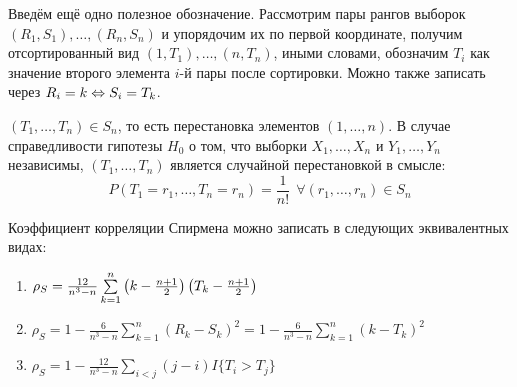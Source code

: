 \begin{definition}
    Введём ещё одно полезное обозначение. Рассмотрим пары рангов выборок $(R_1, S_1), \dots, (R_n, S_n)$ и упорядочим их по первой координате, получим отсортированный вид $(1, T_1), \dots, (n, T_n)$, иными словами, обозначим $T_i$ как значение второго элемента $i$-й пары после сортировки. Можно также записать через $R_i = k \Leftrightarrow S_i = T_k$.
\end{definition}

\begin{note}
    $(T_1, \dots, T_n) \in S_n$, то есть перестановка элементов $(1, \dots, n)$. В случае справедливости гипотезы $H_0$ о том, что выборки $X_1, \dots, X_n$ и $Y_1, \dots, Y_n$ независимы, $(T_1, \dots, T_n)$ является случайной перестановкой в смысле:
    \[
        P(T_1 = r_1, \dots, T_n = r_n) = \frac{1}{n!} \ \ \forall (r_1, \dots, r_n) \in S_n
    \]
\end{note}

\begin{proposition}
    Коэффициент корреляции Спирмена можно записать в следующих эквивалентных видах:
    \begin{enumerate}
        \item $\rho_S = \frac{12}{n^3-n} \sum\limits_{k=1}^n \left(k - \frac{n+1}{2}\right) \left(T_k -\frac{n+1}{2}\right)$

        \item $\rho_S = 1 - \frac{6}{n^3-n} \sum\limits_{k=1}^n (R_k-S_k)^2 = 1 - \frac{6}{n^3-n} \sum\limits_{k=1}^n (k-T_k)^2$

        \item $\rho_S = 1 - \frac{12}{n^3-n} \sum\limits_{i<j} (j-i) I\{T_i > T_j\}$
    \end{enumerate}
\end{proposition}


